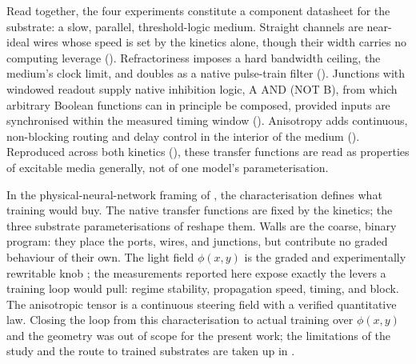 Read together, the four experiments constitute a component datasheet for the substrate: a slow, parallel, threshold-logic medium.
Straight channels are near-ideal wires whose speed is set by the kinetics alone, though their width carries no computing leverage ().
Refractoriness imposes a hard bandwidth ceiling, the medium's clock limit, and doubles as a native pulse-train filter ().
Junctions with windowed readout supply native inhibition logic, A AND (NOT B), from which arbitrary Boolean functions can in principle be composed, provided inputs are synchronised within the measured timing window ().
Anisotropy adds continuous, non-blocking routing and delay control in the interior of the medium ().
Reproduced across both kinetics (), these transfer functions are read as properties of excitable media generally, not of one model's parameterisation.

In the physical-neural-network framing of , the characterisation defines what training would buy.
The native transfer functions are fixed by the kinetics; the three substrate parameterisations of  reshape them.
Walls are the coarse, binary program: they place the ports, wires, and junctions, but contribute no graded behaviour of their own.
The light field $\phi(x,y)$ is the graded and experimentally rewritable knob \cite{sakurai2002design}; the measurements reported here expose exactly the levers a training loop would pull: regime stability, propagation speed, timing, and block.
The anisotropic tensor is a continuous steering field with a verified quantitative law.
Closing the loop from this characterisation to actual training over $\phi(x,y)$ and the geometry was out of scope for the present work; the limitations of the study and the route to trained substrates are taken up in .
